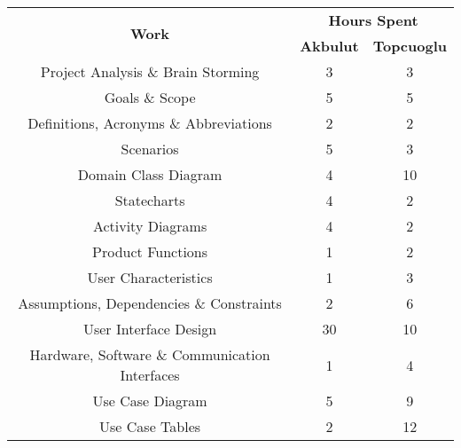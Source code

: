 \begin{table}[ht]
\centering
\begin{tabular}{|c|c|c|}
\hline
\multirow{2}{*}{\textbf{Work}} & \multicolumn{2}{c|}{\textbf{Hours Spent}} \\ \cline{2-3}
                                    & \textbf{Akbulut} & \textbf{Topcuoglu} \\ \hline
Project Analysis \& Brain Storming                                                      & 3          & 3          \\ \hline
Goals \& Scope                                                                          & 5          & 5          \\ \hline
Definitions, Acronyms \& Abbreviations                                                  & 2          & 2          \\ \hline
Scenarios                                                                               & 5          & 3          \\ \hline
Domain Class Diagram                                                                     & 4         & 10          \\ \hline
Statecharts                                                                              & 4          & 2          \\ \hline
Activity Diagrams                                                                        & 4          & 2         \\ \hline
Product Functions                                                                        & 1          & 2          \\ \hline
User Characteristics                                                                     & 1          & 3          \\ \hline
Assumptions, Dependencies \& Constraints                                                 & 2          & 6          \\ \hline
User Interface Design                                                                    & 30          & 10          \\ \hline
Hardware, Software \& Communication Interfaces                                           & 1          & 4          \\ \hline
Use Case Diagram                                                                         & 5          & 9          \\ \hline
Use Case Tables                                                                           & 2          & 12          \\ \hline

\end{tabular}
\end{table}

